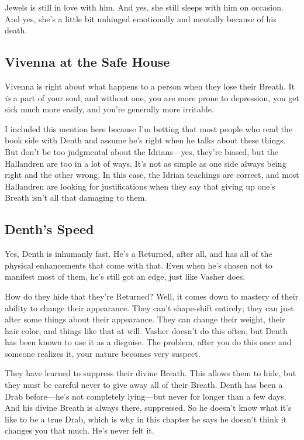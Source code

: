 Jewels is still in love with him. And yes, she still sleeps with him on occasion. And yes, she’s a little bit unhinged emotionally and mentally because of his death.

\subsection*{Vivenna at the Safe House}

Vivenna is right about what happens to a person when they lose their Breath. It \textit{is} a part of your soul, and without one, you are more prone to depression, you get sick much more easily, and you’re generally more irritable.

I included this mention here because I’m betting that most people who read the book side with Denth and assume he’s right when he talks about these things. But don’t be too judgmental about the Idrians—yes, they’re biased, but the Hallandren are too in a lot of ways. It’s not as simple as one side always being right and the other wrong. In this case, the Idrian teachings are correct, and most Hallandren are looking for justifications when they say that giving up one’s Breath isn’t all that damaging to them.

\subsection*{Denth’s Speed}

Yes, Denth is inhumanly fast. He’s a Returned, after all, and has all of the physical enhancements that come with that. Even when he’s chosen not to manifest most of them, he’s still got an edge, just like Vasher does.

How do they hide that they’re Returned? Well, it comes down to mastery of their ability to change their appearance. They can’t shape-shift entirely; they can just alter some things about their appearance. They can change their weight, their hair color, and things like that at will. Vasher doesn’t do this often, but Denth has been known to use it as a disguise. The problem, after you do this once and someone realizes it, your nature becomes very suspect.

They have learned to suppress their divine Breath. This allows them to hide, but they must be careful never to give away all of their Breath. Denth has been a Drab before—he’s not completely lying—but never for longer than a few days. And his divine Breath is always there, suppressed. So he doesn’t know what it’s like to be a true Drab, which is why in this chapter he says he doesn’t think it changes you that much. He’s never felt it.

